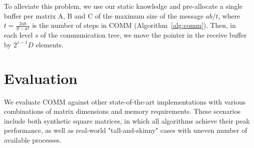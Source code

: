 \documentclass[sigplan,review,anonymous]{acmart}\settopmatter{printfolios=true,printccs=false,printacmref=false}
\newcommand\greg[1]{\textcolor{blue}{[Greg: #1]}}
\begin{document}
To alleviate this problem, we use our static knowledge and pre-allocate a 
single buffer per matrix A, B and C of the maximum size of the message $ab/t$, 
where $t = \frac{2ab}{S - a^2}$ is the number of steps in COMM 
(Algorithm~\ref{alg:comm}). Then, in each level $s$ of the communication tree, 
we  move the pointer in the receive buffer by $2^{s-1} D$ elements.

%

\section{Evaluation}
\label{sec:evaluation}

We evaluate COMM against other state-of-the-art implementations with various 
combinations of matrix dimensions and memory requirements. These scenarios 
include both synthetic square matrices, in which all algorithms achieve their 
peak performance, as well as real-world "tall-and-skinny" cases with uneven 
number of available processes. 
 
\end{document}
